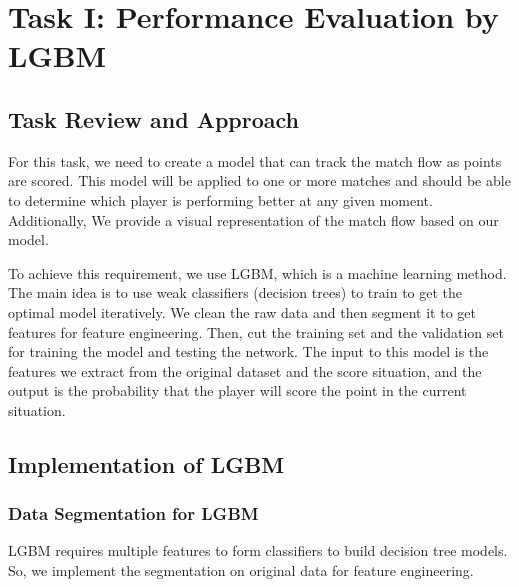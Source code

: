 \documentclass{mcmthesis}
\begin{document}
\section{Task I: Performance Evaluation by LGBM}
\subsection{Task Review and Approach}
For this task, we need to create a model that can track the match flow as points are scored. This model will be applied to one or more matches and should be able to determine which player is performing better at any given moment. Additionally, We provide a visual representation of the match flow based on our model.

To achieve this requirement, we use LGBM, which is a machine learning method. The main idea is to use weak classifiers (decision trees) to train to get the optimal model iteratively. We clean the raw data and then segment it to get features for feature engineering. Then, cut the training set and the validation set for training the model and testing the network. The input to this model is the features we extract from the original dataset and the score situation, and the output is the probability that the player will score the point in the current situation.

\subsection{Implementation of LGBM}
\subsubsection{Data Segmentation for LGBM}
LGBM requires multiple features to form classifiers to build decision tree models. So, we implement the segmentation on original data for feature engineering.
\end{document}
